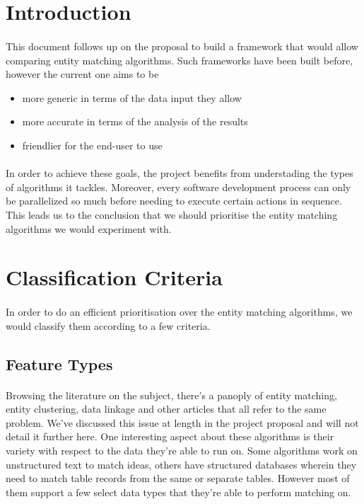 \documentclass[a4paper,12pt]{article}
\begin{document}
\section{Introduction}
\paragraph{}This document follows up on the proposal to build a
framework that would allow comparing entity matching algorithms.
Such frameworks have been built before, however the current one
aims to be
\begin{itemize}
    \item more generic in terms of the data input they allow
    \item more accurate in terms of the analysis of the results
    \item friendlier for the end-user to use
\end{itemize}
\paragraph{}In order to achieve these goals, the project benefits
from understading the types of algorithms it tackles. Moreover,
every software development process can only be parallelized so much
before needing to execute certain actions in sequence. This leads
us to the conclusion that we should prioritise the entity matching
algorithms we would experiment with.
\section{Classification Criteria}
\paragraph{}In order to do an efficient prioritisation over the entity matching
algorithms, we would classify them according to a few criteria.

\subsection{Feature Types}
\paragraph{}Browsing the literature on the subject, there's a panoply of entity
matching, entity clustering, data linkage and other articles that all refer to
the same problem. We've discussed this issue at length in the project proposal
and will not detail it further here. One interesting aspect about these
algorithms is their variety with respect to the data they're able to run on.
Some algorithms work on unstructured text to match ideas, others have structured
databases wherein they need to match table records from the same or separate 
tables. However most of them support a few select data types that they're able
to perform matching on.
\end{document}
